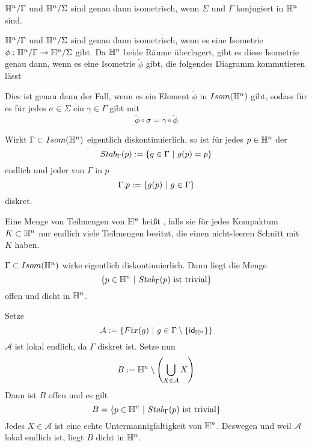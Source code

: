 \documentclass{book}
\begin{document}
\Prop{}
$\mathbb{H}^n / \Gamma$ und $\mathbb{H}^n / \Sigma$ sind genau dann isometrisch, wenn $\Sigma$ und $\Gamma$ konjugiert in $\mathbb{H}^n$ sind.
\begin{Beweis}{}
	$\mathbb{H}^n / \Gamma$ und $\mathbb{H}^n / \Sigma$ sind genau dann isometrisch, wenn es eine Isometrie $\phi : \mathbb{H}^n / \Gamma\overset{}{\rightarrow}\mathbb{H}^n / \Sigma$ gibt. Da $\mathbb{H}^n$ beide Räume überlagert, gibt es diese Isometrie genau dann, wenn es eine Isometrie $\widetilde{\phi}$ gibt, die folgendes Diagramm kommutieren lässt
	\begin{center}
	\end{center}
Dies ist genau dann der Fall, wenn es ein Element $\widetilde{\phi}$ in $Isom(\mathbb{H}^n)$ gibt, sodass für es für jedes $\sigma \in \Sigma$ ein $\gamma \in \Gamma$ gibt mit
\[ \widetilde{\phi}  \circ \sigma = \gamma \circ \widetilde{\phi} \]
\end{Beweis}

\Bem{}
Wirkt $\Gamma \subset Isom(\mathbb{H}^n)$ eigentlich diskontinuierlich, so ist für jedes $p\in \mathbb{H}^n$ der 
\[ Stab_\Gamma(p) := \set{g \in \Gamma}{g(p) = p} \]
endlich und jeder  von $\Gamma$ in $p$
\[ \Gamma.p := \set{g(p)}{g\in \Gamma} \]
diskret.

\Def{}
Eine Menge von Teilmengen von $\mathbb{H}^n$ heißt , falls sie für jedes Kompaktum $K \subset \mathbb{H}^n$ nur endlich viele Teilmengen besitzt, die einen nicht-leeren Schnitt mit $K$ haben.

\Prop{}
$\Gamma\subset Isom(\mathbb{H}^n)$ wirke eigentlich diskontinuierlich. Dann liegt die Menge
\[ \set{p \in \H^n}{ Stab_\Gamma(p) \text{ ist trivial} } \]
offen und dicht in $\mathbb{H}^n$.
\begin{Beweis}{}
	Setze
	\[ \mathcal{A}:= \set{Fix(g)}{g \in \Gamma \setminus \{\id{\H^n}\}} \]
	$\mathcal{A}$ ist lokal endlich, da $\Gamma$ diskret ist. Setze nun
	\[ B:= \mathbb{H}^n\setminus \left(\bigcup_{X \in \mathcal{A}} X\right) \]
	Dann ist $B$ offen und es gilt
	\[ B = \set{p \in \H^n}{ Stab_\Gamma(p) \text{ ist trivial} } \]
	Jedes $X \in \mathcal{A}$ ist eine echte Untermannigfaltigkeit von $\mathbb{H}^n$. Deswegen und weil $\mathcal{A}$ lokal endlich ist, liegt $B$ dicht in $\mathbb{H}^n$.
\end{Beweis}
\end{document}
